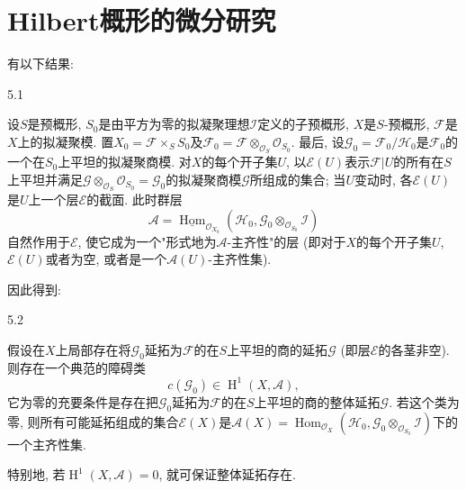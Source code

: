 \chapter{Hilbert概形的微分研究}\thispagestyle{fancy}\label{fga3.iv-5}
\par{}有以下结果:
\begin{proposition}{5.1}\label{fga3.iv-5-proposition-5.1}\skipsinglepar
\par{}设\(S\)是预概形, \(S_0\)是由平方为零的拟凝聚理想\(\mathscr {I}\)定义的子预概形, \(X\)是\(S\)-预概形, \(\mathscr {F}\)是\(X\)上的拟凝聚模. 置\(X_0=\mathscr {F}\times _S S_0\)及\(\mathscr {F}_0=\mathscr {F}\otimes _{\mathcal {O}_S}\mathcal {O}_{S_0}\). 最后, 设\(\mathscr {G}_0=\mathscr {F}_0/\mathscr {H}_0\)是\(\mathscr {F}_0\)的一个在\(S_0\)上平坦的拟凝聚商模. 对\(X\)的每个开子集\(U\), 以\(\mathscr {E}(U)\)表示\(\mathscr {F}|U\)的所有在\(S\)上平坦并满足\(\mathscr {G}\otimes _{\mathcal {O}_S}\mathcal {O}_{S_0}=\mathscr {G}_0\)的拟凝聚商模\(\mathscr {G}\)所组成的集合; 当\(U\)变动时, 各\(\mathscr {E}(U)\)是\(U\)上一个层\(\mathscr {E}\)的截面. 此时群层\[       \mathscr {A}       = \underline {\operatorname {Hom}}_{\mathcal {O}_{X_0}}(\mathscr {H}_0,\mathscr {G}_0\otimes _{\mathcal {O}_{S_0}}\mathscr {I})     \]自然作用于\(\mathscr {E}\), 使它成为一个"形式地为\(\mathscr {A}\)-主齐性"的层 (即对于\(X\)的每个开子集\(U\), \(\mathscr {E}(U)\)或者为空, 或者是一个\(\mathscr {A}(U)\)-主齐性集).
\end{proposition}
\par{}因此得到:
\begin{corollary}{5.2}\label{fga3.iv-5-corollary-5.2}\skipsinglepar
\par{}假设在\(X\)上局部存在将\(\mathscr {G}_0\)延拓为\(\mathscr {F}\)的在\(S\)上平坦的商的延拓\(\mathscr {G}\) (即层\(\mathscr {E}\)的各茎非空). 则存在一个典范的障碍类\[       c(\mathscr {G}_0) \in  \operatorname {H}^1(X,\mathscr {A}),\] 它为零的充要条件是存在把\(\mathscr {G}_0\)延拓为\(\mathscr {F}\)的在\(S\)上平坦的商的整体延拓\(\mathscr {G}\). 若这个类为零, 则所有可能延拓组成的集合\(\mathscr {E}(X)\)是\(\mathscr {A}(X)=\operatorname {Hom}_{\mathcal {O}_X}(\mathscr {H}_0,\mathscr {G}_0\otimes _{\mathcal {O}_{S_0}}\mathscr {I})\)下的一个主齐性集.
\end{corollary}
\par{}特别地, 若\(\operatorname {H}^1(X,\mathscr {A})=0\), 就可保证整体延拓存在.

